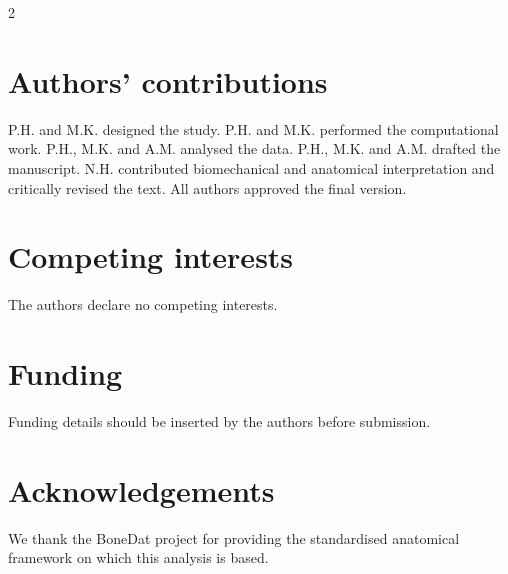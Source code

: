 \documentclass[openacc]{rsproca_new}
\begin{document}
\begin{multicols}{2}
\section*{Authors' contributions}

P.H. and M.K. designed the study. P.H. and M.K. performed the computational work. P.H., M.K. and A.M. analysed the data. P.H., M.K. and A.M. drafted the manuscript. N.H. contributed biomechanical and anatomical interpretation and critically revised the text. All authors approved the final version.

\section*{Competing interests}

The authors declare no competing interests.

\section*{Funding}

Funding details should be inserted by the authors before submission.

\section*{Acknowledgements}

We thank the BoneDat project for providing the standardised anatomical framework on which this analysis is based.

\end{multicols}
\end{document}
